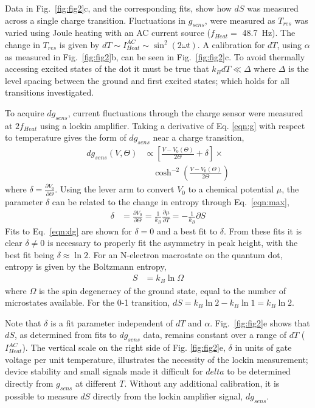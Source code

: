 \documentclass[twocolumn,showpacs,preprintnumbers,amsmath,amssymb,pra,aps,superscriptaddress]{revtex4-1}
\begin{document}
Data in Fig.~\ref{fig:fig2}c, and the corresponding fits, show how $dS$ was measured across a single charge transition. Fluctuations in $g_{sens}$, were measured as $T_{res}$ was varied using Joule heating with an AC current source ($f_{Heat} =$ \SI{48.7}{\hertz}). The change in $T_{res}$ is given by $dT \sim I^{AC}_{Heat} \sim \sin^2(2\omega t)$. A calibration for $dT$, using $\alpha$ as measured in Fig.~\ref{fig:fig2}b, can be seen in Fig.~\ref{fig:fig2}c. To avoid thermally accessing excited states of the dot it must be true that $k_B dT \ll \Delta$ where $\Delta$ is the level spacing between the ground and first excited states; which holds for all transitions investigated. 

To acquire $dg_{sens}$, current fluctuations through the charge sensor were measured at $2f_{Heat}$ using a lockin amplifier. Taking a derivative of Eq. \ref{eqn:g} with respect to temperature gives the form of $dg_{sens}$ near a charge transition,
%
\begin{align}
\label{eqn:dg}
        dg_{sens}(V, \Theta) &\propto \left[ \frac{V-V_0(\Theta)}{2\Theta} + \delta \right]\times \\
        				      &\quad\cosh^{-2}\left(\frac{V-V_0(\Theta)}{2\Theta}\right) \nonumber
\end{align}
%
where $\delta=\frac{\partial V_0}{\partial \Theta}$. Using the lever arm to convert $V_0$ to a chemical potential $\mu$, the parameter $\delta$ can be related to the change in entropy through Eq.~\ref{eqn:max},
%
\begin{align}
\label{eqn:delta}
        \delta &= \frac{\partial V_0}{\partial \Theta} = 
        \frac{1}{k_B} \frac{\partial \mu}{\partial T} = 
        -\frac{1}{k_B} \partial S
\end{align}
%
Fits to Eq.~\ref{eqn:dg} are shown for $\delta=0$ and a best fit to $\delta$. From these fits it is clear $\delta\neq0$ is necessary to properly fit the asymmetry in peak height, with the best fit being $\delta \approx \ln{2}$. For an N-electron macrostate on the quantum dot, entropy is given by the Boltzmann entropy,
%
\begin{align}
\label{eqn:S}
        S &= k_B \ln{\Omega}
\end{align}
%
where $\Omega$ is the spin degeneracy of the ground state, equal to the number of microstates available. For the 0-1 transition, $dS =  k_B\ln{2} - k_B \ln{1} = k_B\ln{2}$.

Note that $\delta$ is a fit parameter independent of $dT$ and $\alpha$. Fig.~\ref{fig:fig2}e shows that $dS$, as determined from fits to $dg_{sens}$ data, remains constant over a range of $dT$ ($I^{AC}_{Heat}$). The vertical scale on the right side of Fig. \ref{fig:fig2}e, $\delta$ in units of gate voltage per unit temperature, illustrates the necessity of the lockin measurement; device stability and small signals made it difficult for $delta$ to be determined directly from $g_{sens}$ at different $T$. Without any additional calibration, it is possible to measure $dS$ directly from the lockin amplifier signal, $dg_{sens}$.
\end{document}
